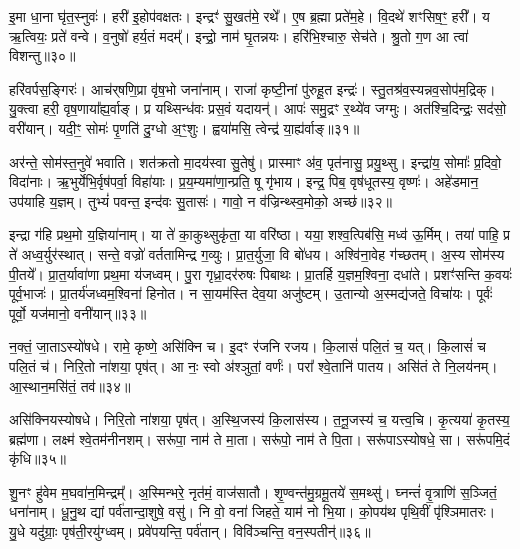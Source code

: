 इ॒मा धा॒ना घृ॑त॒स्नुवः॑।
हरी॑ इ॒होप॑वक्षतः।
इन्द्रꣳ॑ सु॒खत॑मे॒ रथे᳚।
ए॒ष ब्र॒ह्मा प्रते॑म॒हे।
वि॒दथे॑ शꣳसिष॒ꣳ॒ हरी᳚।
य ऋ॒त्वियः॒ प्रते॑ वन्वे।
व॒नुषो॑ हर्य॒तं मदम्᳚।
इन्द्रो॒ नाम॑ घृ॒तन्नयः।
हरि॑भि॒श्चारु॒ सेच॑ते।
श्रु॒तो ग॒ण आ त्वा॑ विशन्तु॥३०॥\ip

हरि॑वर्पस॒ङ्गिरः॑।
आच॑र्‌\mbox{}षणि॒प्रा वृ॑ष॒भो जना॑नाम्।
राजा॑ कृष्टी॒नां पु॑रुहू॒त इन्द्रः॑।
स्तु॒तश्र॑व॒स्यन्नव॒सोप॑म॒द्रिक्।
यु॒क्त्वा हरी॒ वृष॒णाया᳚ह्य॒र्वाङ्।
प्र यथ्सिन्ध॑वः प्रस॒वं यदायन्॑।
आपः॑ समु॒द्रꣳ र॒थ्ये॑व जग्मुः।
अत॑श्चि॒दिन्द्रः॒ सद॑सो॒ वरी॑यान्।
यदी॒ꣳ॒ सोमः॑ पृ॒णति॑ दु॒ग्धो अ॒ꣳ॒शुः।
ह्वया॑मसि॒ त्वेन्द्र॑ या॒ह्य॑र्वाङ्॥३१॥\ip

अर॑न्ते॒ सोम॑स्त॒नुवे॑ भवाति।
शत॑क्रतो मा॒दय॑स्वा सु॒तेषु॑।
प्रास्माꣳ अ॑व॒ पृत॑नासु॒ प्रयु॒थ्सु।
इन्द्रा॑य॒ सोमाः᳚ प्र॒दिवो॒ विदा॑नाः।
ऋ॒भुर्येभि॒र्वृष॑पर्वा॒ विहा॑याः।
प्र॒य॒म्यमा॑णा॒न्प्रति॒ षू गृ॑भाय।
इन्द्र॒ पिब॒ वृष॑धूतस्य॒ वृष्णः॑।
अहे॑डमान॒ उप॑याहि य॒ज्ञम्।
तुभ्यं॑ पवन्त॒ इन्द॑वः सु॒तासः॑।
गावो॒ न व॑ज्रिन्थ्स्व॒मोको॒ अच्छ॑॥३२॥\ip

इन्द्रा ग॑हि प्रथ॒मो य॒ज्ञिया॑नाम्।
या ते॑ का॒कुथ्सुकृ॑ता॒ या वरि॑ष्ठा।
यया॒ शश्व॒त्पिब॑सि॒ मध्व॑ ऊ॒र्मिम्।
तया॑ पाहि॒ प्र ते॑ अध्व॒र्युर॑स्थात्।
सन्ते॒ वज्रो॑ वर्ततामिन्द्र ग॒व्युः।
प्रा॒त॒र्युजा॒ वि बो॑धय।
अश्वि॑ना॒वेह ग॑च्छतम्।
अ॒स्य सोम॑स्य पी॒तये᳚।
प्रा॒त॒र्यावा॑णा प्रथ॒मा य॑जध्वम्।
पु॒रा गृध्रा॒दर॑रुषः पिबाथः।
प्रा॒तर्\mbox{}हि य॒ज्ञम॒श्विना॒ दधा॑ते।
प्रशꣳ॑सन्ति क॒वयः॑ पूर्व॒भाजः॑।
प्रा॒तर्य॑जध्वम॒श्विना॑ हिनोत।
न सा॒यम॑स्ति देव॒या अजु॑ष्टम्।
उ॒तान्यो अ॒स्मद्य॑जते॒ विचा॑यः।
पूर्वः॑ पूर्वो॒ यज॑मानो॒ वनी॑यान्॥३३॥\ip\anuvakamend[चा॒श्व॒जिद्यो ग॑च्छतं नो॒ दाश॒न्नामा॑भि॒श्रीर्ग॑मेम स॒प्रथा॑ भजामहे विशन्तु या॒ह्य॑र्वाङच्छ॑ पिबाथः॒ षट्च॑]

न॒क्तं॒ जा॒ता\-ऽस्यो॑षधे।
रामे॒ कृष्णे॒ असि॑क्नि च।
इ॒दꣳ र॑जनि रजय।
कि॒लासं॑ पलि॒तं च॒ यत्।
कि॒लासं॑ च पलि॒तं च॑।
निरि॒तो ना॑शया॒ पृष॑त्।
आ नः॒ स्वो अ॑श्ञुतां॒ वर्णः॑।
परा᳚ श्वे॒तानि॑ पातय।
असि॑तं ते नि॒लय॑नम्।
आ॒स्थान॒मसि॑तं॒ तव॑॥३४॥\ip

असि॑क्नियस्योषधे।
निरि॒तो ना॑शया॒ पृष॑त्।
अ॒स्थि॒जस्य॑ कि॒लास॑स्य।
त॒नू॒जस्य॑ च॒ यत्त्व॒चि।
कृ॒त्यया॑ कृ॒तस्य॒ ब्रह्म॑णा।
लक्ष्म॑ श्वे॒तम॑नीनशम्।
सरू॑पा॒ नाम॑ ते मा॒ता।
सरू॑पो॒ नाम॑ ते पि॒ता।
सरू॑पा\-ऽस्योषधे॒ सा।
सरू॑पमि॒दं कृ॑धि॥३५॥\ip

शु॒नꣳ हु॑वेम म॒घवा॑न॒मिन्द्रम्᳚।
अ॒स्मिन्भरे॒ नृत॑मं॒ वाज॑सातौ।
शृ॒ण्वन्त॑मु॒ग्रमू॒तये॑ स॒मथ्सु॑।
घ्नन्तं॑ वृ॒त्राणि॑ स॒ञ्जितं॒ धना॑नाम्।
धू॒नु॒थ द्यां पर्व॑तान्दा॒शुषे॒ वसु॑।
नि वो॒ वना॑ जिहते॒ याम॑ नो भि॒या।
को॒पय॑थ पृथि॒वीं पृ॑श्ञिमातरः।
यु॒धे यदु॑ग्राः॒ पृष॑ती॒रयु॑ग्ध्वम्।
प्रवे॑पयन्ति॒ पर्व॑तान्।
विवि॑ञ्चन्ति॒ वन॒स्पतीन्॑॥३६॥\ip

